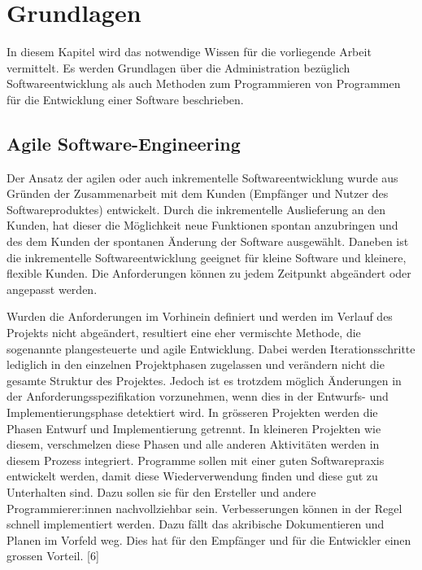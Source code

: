 
\section{Grundlagen}
In diesem Kapitel wird das notwendige Wissen für die vorliegende Arbeit vermittelt. Es werden Grundlagen über die Administration bezüglich Softwareentwicklung als auch Methoden zum Programmieren von Programmen für die Entwicklung einer Software beschrieben.\\

\subsection{Agile Software-Engineering}
Der Ansatz der agilen oder auch inkrementelle Softwareentwicklung wurde aus Gründen der Zusammenarbeit mit dem Kunden (Empfänger und Nutzer des Softwareproduktes) entwickelt. Durch die inkrementelle Auslieferung an den Kunden, hat dieser die Möglichkeit neue Funktionen spontan anzubringen und des dem Kunden der spontanen Änderung der Software ausgewählt. Daneben ist die inkrementelle Softwareentwicklung geeignet für kleine Software und kleinere, flexible Kunden. Die Anforderungen können zu jedem Zeitpunkt abgeändert oder angepasst werden.


Wurden die Anforderungen im Vorhinein definiert und werden im Verlauf des Projekts nicht abgeändert, resultiert eine eher vermischte Methode, die sogenannte plangesteuerte und agile Entwicklung. Dabei werden Iterationsschritte lediglich in den einzelnen Projektphasen zugelassen und verändern nicht die gesamte Struktur des Projektes. Jedoch ist es trotzdem möglich Änderungen in der Anforderungsspezifikation vorzunehmen, wenn dies in der Entwurfs- und Implementierungsphase detektiert wird. In grösseren Projekten werden die Phasen Entwurf und Implementierung getrennt. In kleineren Projekten wie diesem, verschmelzen diese Phasen und alle anderen Aktivitäten werden in diesem Prozess integriert. Programme sollen mit einer guten Softwarepraxis entwickelt werden, damit diese Wiederverwendung finden und diese gut zu Unterhalten sind. Dazu sollen sie für den Ersteller und andere Programmierer:innen nachvollziehbar sein.
Verbesserungen können in der Regel schnell implementiert werden. Dazu fällt das akribische Dokumentieren und Planen im Vorfeld weg. Dies hat für den Empfänger und für die Entwickler einen grossen Vorteil. [6] %

